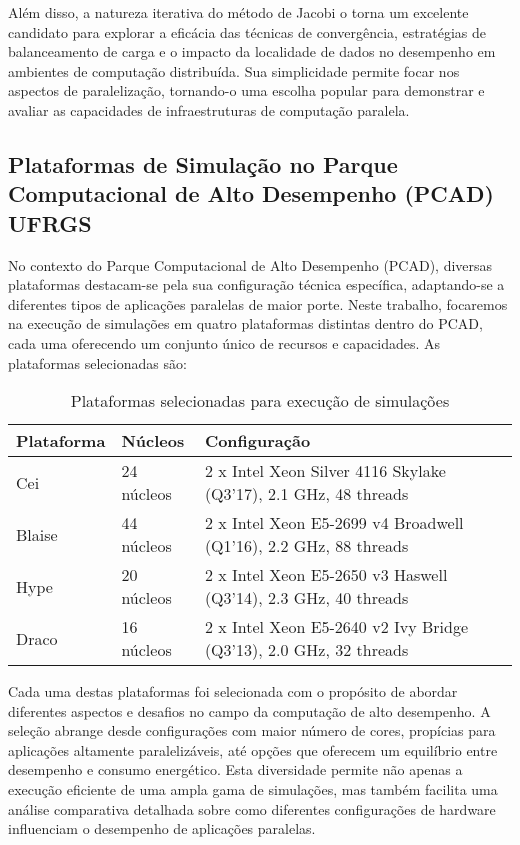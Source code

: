 \documentclass[ppgc,diss]{iiufrgs}
\begin{document}
Além disso, a natureza iterativa do método de Jacobi o torna um excelente candidato para explorar a eficácia das técnicas de convergência, estratégias de balanceamento de carga e o impacto da localidade de dados no desempenho em ambientes de computação distribuída. Sua simplicidade permite focar nos aspectos de paralelização, tornando-o uma escolha popular para demonstrar e avaliar as capacidades de infraestruturas de computação paralela.

\subsection{Plataformas de Simulação no Parque Computacional de Alto Desempenho (PCAD) UFRGS}

No contexto do Parque Computacional de Alto Desempenho (PCAD), diversas plataformas destacam-se pela sua configuração técnica específica, adaptando-se a diferentes tipos de aplicações paralelas de maior porte. Neste trabalho, focaremos na execução de simulações em quatro plataformas distintas dentro do PCAD, cada uma oferecendo um conjunto único de recursos e capacidades. As plataformas selecionadas são:

\begin{table}[h]
	\caption{Plataformas selecionadas para execução de simulações}
	\begin{center}
		\begin{tabular}{l|l|l}
			\textbf{Plataforma} & \textbf{Núcleos} & \textbf{Configuração} \\
			\hline
			\hline
			Cei & 24 núcleos & 2 x Intel Xeon Silver 4116 Skylake (Q3'17), 2.1 GHz, 48 threads \\
			\hline
			Blaise & 44 núcleos & 2 x Intel Xeon E5-2699 v4 Broadwell (Q1'16), 2.2 GHz, 88 threads \\
			\hline
			Hype & 20 núcleos & 2 x Intel Xeon E5-2650 v3 Haswell (Q3'14), 2.3 GHz, 40 threads \\
			\hline
			Draco & 16 núcleos & 2 x Intel Xeon E5-2640 v2 Ivy Bridge (Q3'13), 2.0 GHz, 32 threads \\
			\hline
		\end{tabular}
	\end{center}
	\label{tbl:plataformas_simulacao}
\end{table}

Cada uma destas plataformas foi selecionada com o propósito de abordar diferentes aspectos e desafios no campo da computação de alto desempenho. A seleção abrange desde configurações com maior número de cores, propícias para aplicações altamente paralelizáveis, até opções que oferecem um equilíbrio entre desempenho e consumo energético. Esta diversidade permite não apenas a execução eficiente de uma ampla gama de simulações, mas também facilita uma análise comparativa detalhada sobre como diferentes configurações de hardware influenciam o desempenho de aplicações paralelas.
\end{document}
